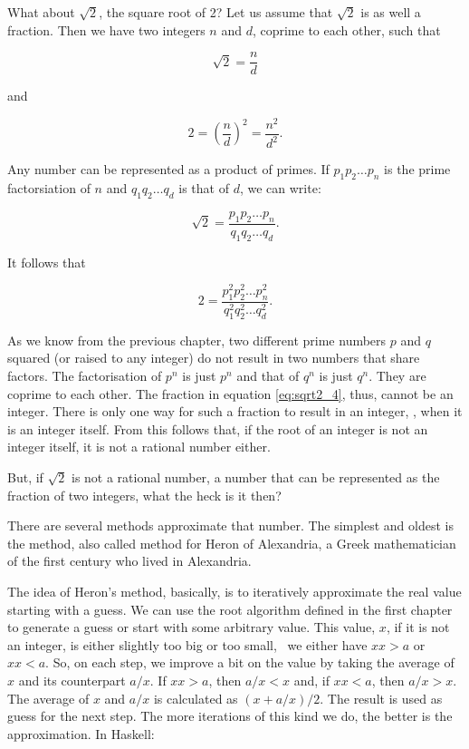 \documentclass[tikz]{scrreprt}
\begin{document}
What about $\sqrt{2}$, the square root of 2?
Let us assume that $\sqrt{2}$ is as well a fraction.
Then we have two integers $n$ and $d$,
coprime to each other, such that

\begin{equation}
\sqrt{2} = \frac{n}{d}
\end{equation}

and

\begin{equation}
2 = \left(\frac{n}{d}\right)^2 = \frac{n^2}{d^2}.
\end{equation}

Any number can be represented as a product of primes.
If $p_1p_2\dots p_n$ is the prime factorsiation of $n$
and $q_1q_2\dots q_d$ is that of $d$,
we can write:

\begin{equation}
\sqrt{2} = \frac{p_1p_2\dots p_n}{q_1q_2\dots q_d}.
\end{equation}

It follows that 

\begin{equation}\label{eq:sqrt2_4}
2 = \frac{p_1^2p_2^2\dots p_n^2}{q_1^2q_2^2\dots q_d^2}.
\end{equation}

As we know from the previous chapter,
two different prime numbers $p$ and $q$ squared 
(or raised to any integer)
do not result in two numbers that share factors.
The factorisation of $p^n$ is just $p^n$ and that
of $q^n$ is just $q^n$. They are coprime to each other.
The fraction in equation \ref{eq:sqrt2_4}, thus,
cannot be an integer.
There is only one way for such a fraction to
result in an integer, \viz, when it is an integer itself.
From this follows that,
if the root of an integer is not an integer itself,
it is not a rational number either.

But, if $\sqrt{2}$ is not a rational number,
a number that can be represented as the fraction
of two integers, what the heck is it then?

There are several methods approximate that number.
The simplest and oldest is the  method,
also called  method for Heron of Alexandria,
a Greek mathematician of the first century who lived in 
Alexandria.

The idea of Heron's method, basically, is to
iteratively approximate the real value starting with a guess.
We can use the root algorithm defined in the first chapter
to generate a guess or start with some arbitrary value.
This value, $x$, if it is not an integer,
is either slightly too big or too small,
\ie\ we either have $xx > a$ or $xx < a$.
So, on each step, we improve a bit on the value
by taking the average of $x$ and its counterpart $a/x$.
If $xx > a$, then $a/x < x$ and, if $xx < a$, then $a/x > x$.
The average of $x$ and $a/x$ is calculated as
$(x+a/x)/2$. The result is used as guess for the next step.
The more iterations of this kind we do,
the better is the approximation. In Haskell:
\end{document}
